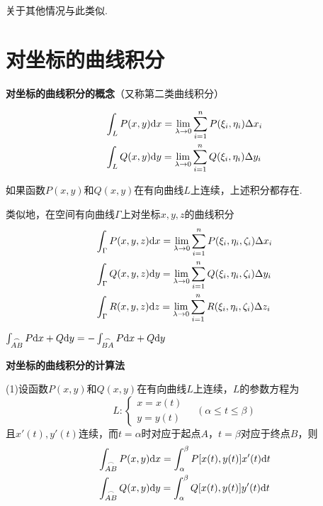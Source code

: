 关于其他情况与此类似.

\section{对坐标的曲线积分}

\textbf{对坐标的曲线积分的概念}（又称第二类曲线积分）

\begin{align*}
    & \int_{L}P(x,y)\mathrm{d} x=\lim_{\lambda\rightarrow 0}\sum_{i=1}^{n} P(\xi_i, \eta_i)\Delta x_{i} \\
    & \int_{L}Q(x,y)\mathrm{d} y=\lim_{\lambda\rightarrow 0}\sum_{i=1}^{n} Q(\xi_i, \eta_i)\Delta y_{i}
\end{align*}

如果函数$P(x,y)$和$Q(x,y)$在有向曲线$L$上连续，上述积分都存在.

类似地，在空间有向曲线$\Gamma$上对坐标$x,y,z$的曲线积分
\begin{align*}
    & \int_{\Gamma}P(x,y,z)\mathrm{d} x=\lim_{\lambda\rightarrow 0}\sum_{i=1}^{n} P(\xi_i, \eta_i, \zeta_i)\Delta x_{i} \\
    & \int_{\Gamma}Q(x,y,z)\mathrm{d} y=\lim_{\lambda\rightarrow 0}\sum_{i=1}^{n} Q(\xi_i, \eta_i, \zeta_i)\Delta y_{i} \\
    & \int_{\Gamma}R(x,y,z)\mathrm{d} z=\lim_{\lambda\rightarrow 0}\sum_{i=1}^{n} R(\xi_i, \eta_i, \zeta_i)\Delta z_{i}
\end{align*}

\begin{property}
    $\int_{\overset{\Large\frown}{AB}}P\mathrm{d} x+Q\mathrm{d} y=-\int_{\overset{\Large\frown}{BA}}P\mathrm{d} x+Q\mathrm{d} y$
\end{property}

\textbf{对坐标的曲线积分的计算法}

(1)设函数$P(x,y)$和$Q(x,y)$在有向曲线$L$上连续，$L$的参数方程为
\begin{equation*}
    L:
    \begin{cases}
        x=x(t) \\
        y=y(t)
    \end{cases}
    \quad (\alpha\leq t\leq \beta)
\end{equation*}
且$x'(t),y'(t)$连续，而$t=\alpha$时对应于起点$A$，$t=\beta$对应于终点$B$，则
\begin{align*}
    & \int_{\overset{\Large\frown}{AB}}P(x,y)\mathrm{d} x=\int_{\alpha}^{\beta} P[x(t),y(t)]x'(t)\mathrm{d} t \\
    & \int_{\overset{\Large\frown}{AB}}Q(x,y)\mathrm{d} y=\int_{\alpha}^{\beta} Q[x(t),y(t)]y'(t)\mathrm{d} t
\end{align*}

